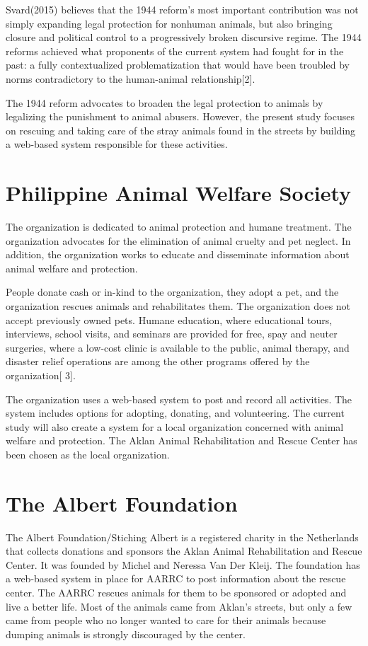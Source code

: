 Svard(2015) believes that the 1944 reform’s most important contribution was
not simply expanding legal protection for nonhuman animals, but also bringing
closure and political control to a progressively broken discursive regime. The 1944
reforms achieved what proponents of the current system had fought for in the past:
a fully contextualized problematization that would have been troubled by norms
contradictory to the human-animal relationship[2].

The 1944 reform advocates to broaden the legal protection to animals by
legalizing the punishment to animal abusers. However, the present study focuses
on rescuing and taking care of the stray animals found in the streets by building
a web-based system responsible for these activities.

\section{Philippine Animal Welfare Society}

The organization is dedicated to animal protection and humane treatment.
The organization advocates for the elimination of animal cruelty and pet neglect.
In addition, the organization works to educate and disseminate information about
animal welfare and protection.

People donate cash or in-kind to the organization, they adopt a pet,
and the organization rescues animals and rehabilitates them. The organization
does not accept previously owned pets. Humane education, where educational
tours, interviews, school visits, and seminars are provided for free, spay and neuter
surgeries, where a low-cost clinic is available to the public, animal therapy, and
disaster relief operations are among the other programs offered by the organization[
3].

The organization uses a web-based system to post and record all activities. The
system includes options for adopting, donating, and volunteering. The current
study will also create a system for a local organization concerned with animal
welfare and protection. The Aklan Animal Rehabilitation and Rescue Center has
been chosen as the local organization.

\section{The Albert Foundation}

The Albert Foundation/Stiching Albert is a registered charity in the Netherlands
that collects donations and sponsors the Aklan Animal Rehabilitation and
Rescue Center. It was founded by Michel and Neressa Van Der Kleij. The foundation
has a web-based system in place for AARRC to post information about the
rescue center. The AARRC rescues animals for them to be sponsored or adopted
and live a better life. Most of the animals came from Aklan’s streets, but only
a few came from people who no longer wanted to care for their animals because
dumping animals is strongly discouraged by the center.

